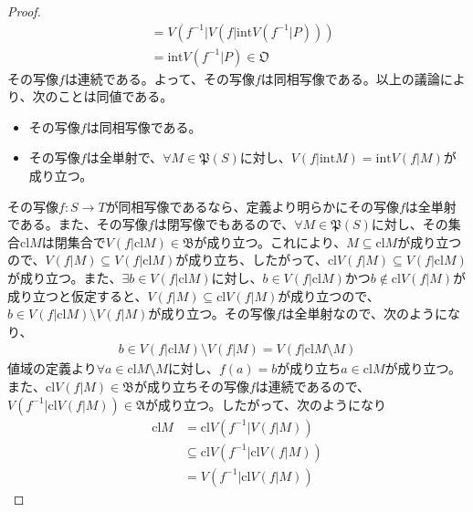 \documentclass[dvipdfmx]{jsarticle}
\begin{document}
\begin{proof}
\begin{align*}
&= V\left( f^{- 1}|V\left( f|{\mathrm{int}}{V\left( f^{- 1}|P \right)} \right) \right)\\
&= {\mathrm{int}}{V\left( f^{- 1}|P \right)} \in \mathfrak{O}
\end{align*}
その写像$f$は連続である。よって、その写像$f$は同相写像である。以上の議論により、次のことは同値である。
\begin{itemize}
\item
  その写像$f$は同相写像である。
\item
  その写像$f$は全単射で、$\forall M \in \mathfrak{P}(S)$に対し、$V\left( f|{\mathrm{int}}M \right) = {\mathrm{int}}{V\left( f|M \right)}$が成り立つ。
\end{itemize}\par
その写像$f:S \rightarrow T$が同相写像であるなら、定義より明らかにその写像$f$は全単射である。また、その写像$f$は閉写像でもあるので、$\forall M\in \mathfrak{P}(S)$に対し、その集合${\mathrm{cl}}M$は閉集合で$V\left( f|{\mathrm{cl}}M \right) \in \mathfrak{B}$が成り立つ。これにより、$M \subseteq {\mathrm{cl}}M$が成り立つので、$V\left( f|M \right) \subseteq V\left( f|{\mathrm{cl}}M \right)$が成り立ち、したがって、${\mathrm{cl}}{V\left( f|M \right)} \subseteq V\left( f|{\mathrm{cl}}M \right)$が成り立つ。また、$\exists b \in V\left( f|{\mathrm{cl}}M \right)$に対し、$b \in V\left( f|{\mathrm{cl}}M \right)$かつ$b \notin {\mathrm{cl}}{V\left( f|M \right)}$が成り立つと仮定すると、$V\left( f|M \right) \subseteq {\mathrm{cl}}{V\left( f|M \right)}$が成り立つので、$b \in V\left( f|{\mathrm{cl}}M \right) \setminus V\left( f|M \right)$が成り立つ。その写像$f$は全単射なので、次のようになり、
\begin{align*}
b \in V\left( f|{\mathrm{cl}}M \right) \setminus V\left( f|M \right) = V\left( f|{\mathrm{cl}}M \setminus M \right)
\end{align*}
値域の定義より$\forall a \in {\mathrm{cl}}M \setminus M$に対し、$f(a) = b$が成り立ち$a \in {\mathrm{cl}}M$が成り立つ。また、${\mathrm{cl}}{V\left( f|M \right)} \in \mathfrak{B}$が成り立ちその写像$f$は連続であるので、$V\left( f^{- 1}|{\mathrm{cl}}{V\left( f|M \right)} \right) \in \mathfrak{A}$が成り立つ。したがって、次のようになり
\begin{align*}
{\mathrm{cl}}M &= {\mathrm{cl}}{V\left( f^{- 1}|V\left( f|M \right) \right)}\\
&\subseteq {\mathrm{cl}}{V\left( f^{- 1}|{\mathrm{cl}}{V\left( f|M \right)} \right)}\\
&= V\left( f^{- 1}|{\mathrm{cl}}{V\left( f|M \right)} \right)
\end{align*}

\end{proof}
\end{document}
